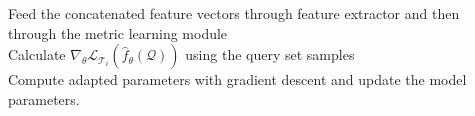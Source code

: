 \begin{algorithm}[h!]
{{{                Feed the concatenated feature vectors through feature extractor and then
                through the metric learning module\\

                Calculate $\nabla_{\theta} \mathcal{L}_{\mathcal{T}_{i}}(\hat{f}_{ \theta}(\mathcal{Q}))$  using the query set samples\\
                
                Compute adapted parameters with gradient descent and update the model parameters.
                

        }
        \vspace{0.25cm}
        }
        \label{psuedocode}
        }
    \end{algorithm}

